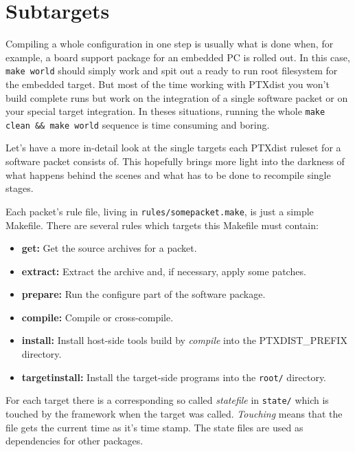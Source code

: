 \chapter{Subtargets} 				\label{chap:subtargets}

Compiling a whole configuration in one step is usually what is done
when, for example, a board support package for an embedded PC is rolled
out. In this case, \texttt{make world} should simply work and spit out a
ready to run root filesystem for the embedded target. But most of the
time working with PTXdist you won't build complete runs but work on the
integration of a single software packet or on your special target
integration. In theses situations, running the whole \texttt{make clean
\&\& make world} sequence is time consuming and boring. 

Let's have a more in-detail look at the single targets each PTXdist
ruleset for a software packet consists of. This hopefully brings more
light into the darkness of what happens behind the scenes and what has
to be done to recompile single stages. 

Each packet's rule file, living in \texttt{rules/somepacket.make}, is
just a simple Makefile. There are several rules which targets this
Makefile must contain: 
%
\begin{itemize}
\setlength{\itemsep}{0pt}
\item \textbf{get:} Get the source archives for a packet. 
\item \textbf{extract:} Extract the archive and, if necessary, apply
      some patches. 
\item \textbf{prepare:} Run the configure part of the software package.
\item \textbf{compile:} Compile or cross-compile. 
\item \textbf{install:} Install host-side tools build by \emph{compile}
      into the PTXDIST\_PREFIX directory. 
\item \textbf{targetinstall:} Install the target-side programs into the 
      \texttt{root/} directory. 
\end{itemize}
%
For each target there is a corresponding so called \emph{statefile} in
\texttt{state/} which is touched by the framework when the target was
called. \emph{Touching} means that the file gets the current time as
it's time stamp. The state files are used as dependencies for other
packages.  

